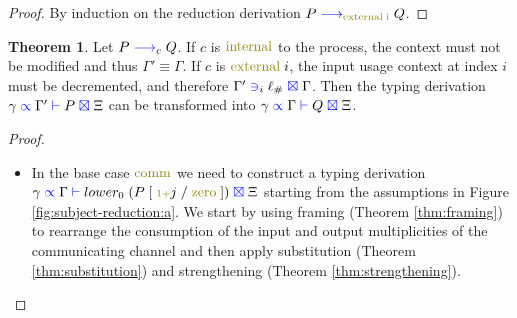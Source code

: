 \documentclass[a4paper,UKenglish,cleveref, autoref, thm-restate,authorcolumns]{lipics-v2019}
\theoremstyle{definition}
\newtheorem{nitheorem}[theorem]{Theorem}
\newcommand{\type}[1]{\textcolor{blue}{\operatorname{#1}}}
\newcommand{\constr}[1]{\textcolor{olive}{\operatorname{#1}}}
\newcommand{\suc}{\constr{\scriptstyle 1+}}
\newcommand{\subst}[3]{#1 \; [ \; #2 \; / \;#3 \;]}
\newcommand{\lio}{\ell_{\#}}
\newcommand{\reduce}[1]{\; \type{\longrightarrow}_{#1} \;}
\newcommand{\types}[4]{#1 \; \type{\propto} \; #2 \; \type{\vdash} \; #3 \; \type{\boxtimes} \; #4}
\newcommand{\containsusage}[4]{#1 \; \type{\ni}_{#2} \; #3 \; \type{\boxtimes} \; #4}
\begin{document}
\begin{proof}
  By induction on the reduction derivation $P \reduce{\constr{external \; i}}Q$.
\end{proof}

\begin{nitheorem}
  Let $P \reduce{c} Q$.
  If $c$ is $\constr{internal}$ to the process, the context must not be modified and thus $\Gamma' \equiv \Gamma$.
  If $c$ is $\constr{external}\; i$, the input usage context at index $i$ must be decremented, and therefore $\containsusage{\Gamma'}{i}{\lio}{\Gamma}$.
  Then the typing derivation $\types{\gamma}{\Gamma'}{P}{\Xi}$ can be transformed into $\types{\gamma}{\Gamma}{Q}{\Xi}$.
\end{nitheorem}

\begin{proof}
  \hfill{}\\
  \begin{itemize}
    \item
    In the base case $\constr{comm}$ we need to construct a typing derivation $\types{\gamma}{\Gamma}{lower_0 \allowbreak \; (\subst{P}{\suc j}{\constr{zero}})}{\Xi}$ starting from the assumptions in Figure \ref{fig:subject-reduction:a}.
    We start by using framing (Theorem \ref{thm:framing}) to rearrange the consumption of the input and output multiplicities of the communicating channel and then apply substitution (Theorem \ref{thm:substitution}) and strengthening (Theorem \ref{thm:strengthening}).


\end{itemize}
\end{proof}
\end{document}

